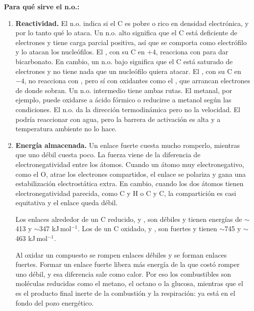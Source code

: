 \textbf{Para qué sirve el n.o.:}

\begin{enumerate}
    \item \textbf{Reactividad.} El n.o. indica si el C es pobre o rico en 
    densidad electrónica, y por lo tanto qué lo ataca. Un n.o. alto 
    significa que el C está deficiente de electrones y tiene carga parcial 
    positiva, así que se comporta como electrófilo y lo atacan los 
    nucleófilos. El , con su C en $+4$, reacciona con 
     para dar bicarbonato. En cambio, un n.o. 
    bajo significa que el C está saturado de electrones y no tiene nada 
    que un nucleófilo quiera atacar. El , con su C en $-4$, no 
    reacciona con , pero sí con oxidantes como 
    el , que arrancan electrones de donde sobran. Un n.o. intermedio 
    tiene ambas rutas. El metanal, por ejemplo, puede oxidarse a ácido 
    fórmico o reducirse a metanol según las condiciones. El n.o. da la 
    dirección termodinámica pero no la velocidad. El  podría 
    reaccionar con agua, pero la barrera de activación es alta y a 
    temperatura ambiente no lo hace.

    \item \textbf{Energía almacenada.} Un enlace fuerte cuesta mucho 
    romperlo, mientras que uno débil cuesta poco. La fuerza viene de la 
    diferencia de electronegatividad entre los átomos. Cuando un átomo muy 
    electronegativo, como el O, atrae los electrones compartidos, el enlace 
    se polariza y gana una estabilización electrostática extra. En cambio, 
    cuando los dos átomos tienen electronegatividad parecida, como C y H o 
    C y C, la compartición es casi equitativa y el enlace queda débil.

    Los enlaces alrededor de un C reducido,  y , son 
    débiles y tienen energías de $\sim$413 y $\sim$347 kJ\,mol$^{-1}$. 
    Los de un C oxidado,  y , son fuertes y tienen 
    $\sim$745 y $\sim$463 kJ\,mol$^{-1}$.

    Al oxidar un compuesto se rompen enlaces débiles y se forman enlaces 
    fuertes. Formar un enlace fuerte libera más energía de la que costó 
    romper uno débil, y esa diferencia sale como calor. Por eso los 
    combustibles son moléculas reducidas como el metano, el octano o la 
    glucosa, mientras que el  es el producto final inerte de la 
    combustión y la respiración: ya está en el fondo del pozo energético.


\end{enumerate}
